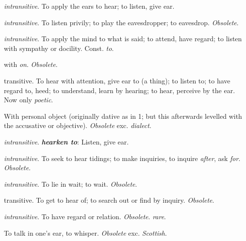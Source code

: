 	\begin{compactitem}
		\item[1] \textit{intransitive}. To apply the ears to hear; to listen, give ear.
		\item[2] \textit{intransitive}. To listen privily; to play the eavesdropper; to eavesdrop. \textit{Obsolete}.
		\item[3.a] \textit{intransitive}. To apply the mind to what is said; to attend, have regard; to listen with sympathy or docility. Const. \textit{to}.
		\item[3.b] with \textit{on}. \textit{Obsolete}.
		\item[4.a] transitive. To hear with attention, give ear to (a thing); to listen to; to have regard to, heed; to understand, learn by hearing; to hear, perceive by the ear. Now only \textit{poetic}.
		\item[4.b] With personal object (originally dative as in 1; but this afterwards levelled with the accusative or objective). \textit{Obsolete} exc. \textit{dialect}.
		\item[5] \textit{intransitive}. \textit{\textbf{hearken to}}: Listen, give ear.
		\item[6] \textit{intransitive}. To seek to hear tidings; to make inquiries, to inquire \textit{after}, ask \textit{for}. \textit{Obsolete}.
		\item[7] \textit{intransitive}. To lie in wait; to wait. \textit{Obsolete}.
		\item[8] transitive. To get to hear of; to search out or find by inquiry. \textit{Obsolete}.
		\item[9] \textit{intransitive}. To have regard or relation. \textit{Obsolete}. \textit{rare}.
		\item[10] To talk in one's ear, to whisper. \textit{Obsolete} exc. \textit{Scottish}.
	\end{compactitem}
	

	

